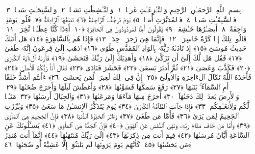 
  
    
  
    
    

\nopagebreak
  بِسمِ ٱللَّهِ ٱلرَّحمَـٰنِ ٱلرَّحِيمِ
  وَٱلنَّـٰزِعَـٰتِ غَرقًۭا ﴿١﴾
 وَٱلنَّـٰشِطَٰتِ نَشطًۭا ﴿٢﴾
 وَٱلسَّٰبِحَـٰتِ سَبحًۭا ﴿٣﴾
 فَٱلسَّٰبِقَـٰتِ سَبقًۭا ﴿٤﴾
 فَٱلمُدَبِّرَٰتِ أَمرًۭا ﴿٥﴾
 يَومَ تَرجُفُ ٱلرَّاجِفَةُ ﴿٦﴾
 تَتبَعُهَا ٱلرَّادِفَةُ ﴿٧﴾
 قُلُوبٌۭ يَومَئِذٍۢ وَاجِفَةٌ ﴿٨﴾
 أَبصَـٰرُهَا خَـٰشِعَةٌۭ ﴿٩﴾
 يَقُولُونَ أَءِنَّا لَمَردُودُونَ فِى ٱلحَافِرَةِ ﴿١٠﴾
 أَءِذَا كُنَّا عِظَـٰمًۭا نَّخِرَةًۭ ﴿١١﴾
 قَالُوا۟ تِلكَ إِذًۭا كَرَّةٌ خَاسِرَةٌۭ ﴿١٢﴾
 فَإِنَّمَا هِىَ زَجرَةٌۭ وَٟحِدَةٌۭ ﴿١٣﴾
 فَإِذَا هُم بِٱلسَّاهِرَةِ ﴿١٤﴾
 هَل أَتَىٰكَ حَدِيثُ مُوسَىٰٓ ﴿١٥﴾
 إِذ نَادَىٰهُ رَبُّهُۥ بِٱلوَادِ ٱلمُقَدَّسِ طُوًى ﴿١٦﴾
 ٱذهَب إِلَىٰ فِرعَونَ إِنَّهُۥ طَغَىٰ ﴿١٧﴾
 فَقُل هَل لَّكَ إِلَىٰٓ أَن تَزَكَّىٰ ﴿١٨﴾
 وَأَهدِيَكَ إِلَىٰ رَبِّكَ فَتَخشَىٰ ﴿١٩﴾
 فَأَرَىٰهُ ٱلءَايَةَ ٱلكُبرَىٰ ﴿٢٠﴾
 فَكَذَّبَ وَعَصَىٰ ﴿٢١﴾
 ثُمَّ أَدبَرَ يَسعَىٰ ﴿٢٢﴾
 فَحَشَرَ فَنَادَىٰ ﴿٢٣﴾
 فَقَالَ أَنَا۠ رَبُّكُمُ ٱلأَعلَىٰ ﴿٢٤﴾
 فَأَخَذَهُ ٱللَّهُ نَكَالَ ٱلءَاخِرَةِ وَٱلأُولَىٰٓ ﴿٢٥﴾
 إِنَّ فِى ذَٟلِكَ لَعِبرَةًۭ لِّمَن يَخشَىٰٓ ﴿٢٦﴾
 ءَأَنتُم أَشَدُّ خَلقًا أَمِ ٱلسَّمَآءُ ۚ بَنَىٰهَا ﴿٢٧﴾
 رَفَعَ سَمكَهَا فَسَوَّىٰهَا ﴿٢٨﴾
 وَأَغطَشَ لَيلَهَا وَأَخرَجَ ضُحَىٰهَا ﴿٢٩﴾
 وَٱلأَرضَ بَعدَ ذَٟلِكَ دَحَىٰهَآ ﴿٣٠﴾
 أَخرَجَ مِنهَا مَآءَهَا وَمَرعَىٰهَا ﴿٣١﴾
 وَٱلجِبَالَ أَرسَىٰهَا ﴿٣٢﴾
 مَتَـٰعًۭا لَّكُم وَلِأَنعَـٰمِكُم ﴿٣٣﴾
 فَإِذَا جَآءَتِ ٱلطَّآمَّةُ ٱلكُبرَىٰ ﴿٣٤﴾
 يَومَ يَتَذَكَّرُ ٱلإِنسَـٰنُ مَا سَعَىٰ ﴿٣٥﴾
 وَبُرِّزَتِ ٱلجَحِيمُ لِمَن يَرَىٰ ﴿٣٦﴾
 فَأَمَّا مَن طَغَىٰ ﴿٣٧﴾
 وَءَاثَرَ ٱلحَيَوٰةَ ٱلدُّنيَا ﴿٣٨﴾
 فَإِنَّ ٱلجَحِيمَ هِىَ ٱلمَأوَىٰ ﴿٣٩﴾
 وَأَمَّا مَن خَافَ مَقَامَ رَبِّهِۦ وَنَهَى ٱلنَّفسَ عَنِ ٱلهَوَىٰ ﴿٤٠﴾
 فَإِنَّ ٱلجَنَّةَ هِىَ ٱلمَأوَىٰ ﴿٤١﴾
 يَسـَٔلُونَكَ عَنِ ٱلسَّاعَةِ أَيَّانَ مُرسَىٰهَا ﴿٤٢﴾
 فِيمَ أَنتَ مِن ذِكرَىٰهَآ ﴿٤٣﴾
 إِلَىٰ رَبِّكَ مُنتَهَىٰهَآ ﴿٤٤﴾
 إِنَّمَآ أَنتَ مُنذِرُ مَن يَخشَىٰهَا ﴿٤٥﴾
 كَأَنَّهُم يَومَ يَرَونَهَا لَم يَلبَثُوٓا۟ إِلَّا عَشِيَّةً أَو ضُحَىٰهَا ﴿٤٦﴾
 
